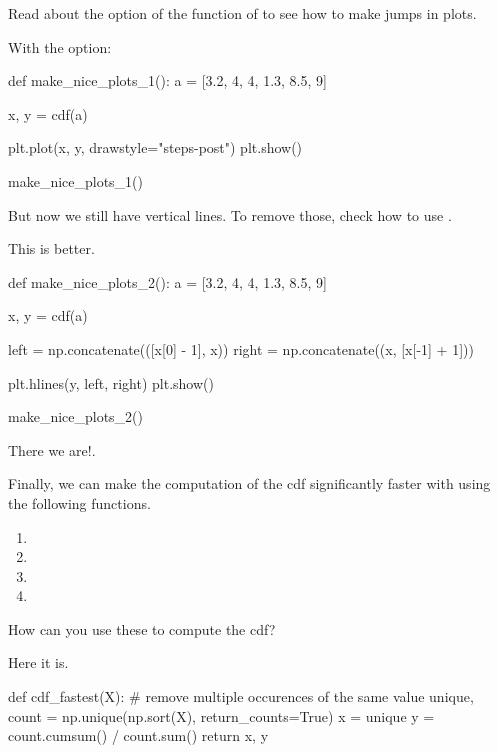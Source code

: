 \begin{exercise}
Read about the  option of the  function of  to see how to make jumps in plots.
\begin{solution}
With the  option:
\begin{pyverbatim}

def make_nice_plots_1():
    a = [3.2, 4, 4, 1.3, 8.5, 9]

    x, y = cdf(a)

    plt.plot(x, y, drawstyle="steps-post")
    plt.show()

make_nice_plots_1()
\end{pyverbatim}
\end{solution}
\end{exercise}

\begin{exercise}
But now we still have vertical lines. To remove those, check how to use .
\begin{solution}
This is better.
\begin{pyverbatim}
def make_nice_plots_2():
    a = [3.2, 4, 4, 1.3, 8.5, 9]

    x, y = cdf(a)

    left = np.concatenate(([x[0] - 1], x))
    right = np.concatenate((x, [x[-1] + 1]))

    plt.hlines(y, left, right)
    plt.show()


make_nice_plots_2()
\end{pyverbatim}

There  we are!.
  \end{solution}
\end{exercise}


\begin{exercise}
Finally, we can make the computation of the cdf significantly faster with using the following  functions.
\begin{enumerate}
\item {}
\item {}
\item {}
\item {}
\end{enumerate}
How can you use these to compute the cdf?
\begin{solution}
Here it is.
\begin{pyverbatim}
def cdf_fastest(X):
    # remove multiple occurences of the same value
    unique, count = np.unique(np.sort(X), return_counts=True)
    x = unique
    y = count.cumsum() / count.sum()
    return x, y

\end{pyverbatim}

\end{solution}
\end{exercise}

